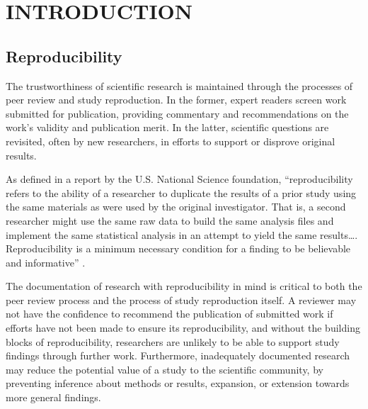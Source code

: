\chapter{INTRODUCTION}
\section{Reproducibility}
The trustworthiness of scientific research is maintained through the
processes of peer review and study reproduction. In the former, expert readers
screen work submitted for publication, providing commentary and recommendations
on the work’s validity and publication merit. In the latter, scientific
questions are revisited, often by new researchers, in efforts to support or
disprove original results.

As defined in a report by the U.S. National Science foundation,
“reproducibility refers to the ability of a researcher to duplicate the results
of a prior study using the same materials as were used by the original
investigator. That is, a second researcher might use the same raw data to build
the same analysis files and implement the same statistical analysis in an
attempt to yield the same results…. Reproducibility is a minimum necessary
condition for a finding to be believable and informative” \parencite[3]{cacioppo_social_2015}.

The documentation of research with reproducibility in mind is critical to
both the peer review process and the process of study reproduction itself. A
reviewer may not have the confidence to recommend the publication of submitted
work if efforts have not been made to ensure its reproducibility, and without
the building blocks of reproducibility, researchers are unlikely to be able to
support study findings through further work. Furthermore, inadequately
documented research may reduce the potential value of a study to the scientific
community, by preventing inference about methods or results, expansion, or
extension towards more general findings.

